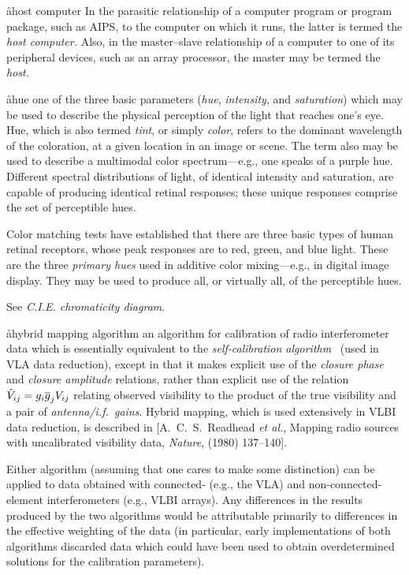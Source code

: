 \aa{host computer}
In the parasitic relationship of a computer program or program package,
such as AIPS, to the computer on which it runs, the latter is
termed the {\it host computer.}
Also, in the master--slave relationship of a computer to
one of its peripheral devices, such as an array processor,
the master may be termed the {\it host.}

\aa{hue}
one of the three basic parameters ({\it hue}, {\it intensity},
and {\it saturation}\/) which may be used to describe the
physical perception of the light that reaches one's eye.
Hue, which is also termed {\it tint}, or simply {\it color},
refers to the dominant wavelength of the coloration,
at a given location in an image or scene.
The term also may be used to describe
a multimodal color spectrum---e.g., one speaks of a purple hue.
Different spectral distributions of light,
of identical intensity and saturation,
are capable of producing identical retinal responses;
these unique responses comprise the set of perceptible hues.
\par
Color matching tests have established that
there are three basic types of human retinal receptors,
whose peak responses are to red, green, and blue light.
These are the three {\it primary hues} used in additive color
mixing---e.g., in digital image display.
They may be used to produce all, or virtually all, of the
perceptible hues.
\par
See {\it C.I.E. chromaticity diagram}.

\aa{hybrid mapping algorithm}
an algorithm for calibration of radio interferometer data
which is essentially equivalent to the {\it self-calibration
algorithm} \qv\ (used in VLA data reduction), except in that it
makes explicit use of the {\it closure phase} and
{\it closure amplitude} relations,
rather than explicit use of the relation
$\tilde V_{ij}=g_i\overline g_jV_{ij}$
relating observed visibility to the product of the true
visibility and a pair of {\it antenna/i.f.\ gains}.
Hybrid mapping, which is used extensively in VLBI data reduction,
is described in
[A.~C.~S.~Readhead {\it et al.}, Mapping radio sources with
uncalibrated visibility data, {\it Nature}, 
(1980) 137--140].
\par
Either algorithm (assuming that one cares to make some distinction)
can be applied to data obtained with connected-
(e.g., the VLA) and non-connected-element
interferometers (e.g., VLBI arrays).
Any differences in the results produced by the two algorithms
would be attributable primarily to differences in the effective weighting
of the data (in particular, early implementations of both
algorithms discarded data which could have been used to obtain overdetermined
solutions for the calibration parameters).

